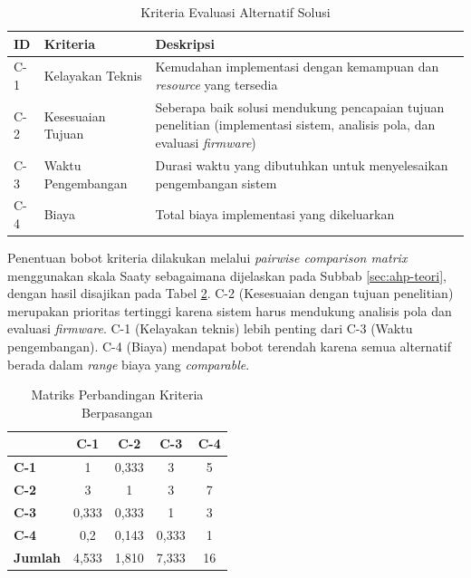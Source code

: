 \begin{table}[H]
  \caption{Kriteria Evaluasi Alternatif Solusi}
  \label{tab:kriteria-ahp}
  \begin{tabularx}{\textwidth}{| l | l | X |}
    \hline
    \textbf{ID} & \textbf{Kriteria} & \textbf{Deskripsi} \\
    \hline
    C-1 & Kelayakan Teknis & Kemudahan implementasi dengan kemampuan dan \textit{resource} yang tersedia \\
    \hline
    C-2 & Kesesuaian Tujuan & Seberapa baik solusi mendukung pencapaian tujuan penelitian (implementasi sistem, analisis pola, dan evaluasi \textit{firmware}) \\
    \hline
    C-3 & Waktu Pengembangan & Durasi waktu yang dibutuhkan untuk menyelesaikan pengembangan sistem \\
    \hline
    C-4 & Biaya & Total biaya implementasi yang dikeluarkan \\
    \hline
  \end{tabularx}
\end{table}

Penentuan bobot kriteria dilakukan melalui \textit{pairwise comparison matrix} menggunakan skala Saaty sebagaimana dijelaskan pada Subbab \ref{sec:ahp-teori}, dengan hasil disajikan pada Tabel \ref{tab:matriks-kriteria}. C-2 (Kesesuaian dengan tujuan penelitian) merupakan prioritas tertinggi karena sistem harus mendukung analisis pola dan evaluasi \textit{firmware}. C-1 (Kelayakan teknis) lebih penting dari C-3 (Waktu pengembangan). C-4 (Biaya) mendapat bobot terendah karena semua alternatif berada dalam \textit{range} biaya yang \textit{comparable}.

\begin{table}[H]
  \caption{Matriks Perbandingan Kriteria Berpasangan}
  \label{tab:matriks-kriteria}
  \begin{tabular}{| l | c | c | c | c |}
    \hline
    & \textbf{C-1} & \textbf{C-2} & \textbf{C-3} & \textbf{C-4} \\
    \hline
    \textbf{C-1} & 1     & 0,333 & 3     & 5 \\
    \hline
    \textbf{C-2} & 3     & 1     & 3     & 7 \\
    \hline
    \textbf{C-3} & 0,333 & 0,333 & 1     & 3 \\
    \hline
    \textbf{C-4} & 0,2   & 0,143 & 0,333 & 1 \\
    \hline
    \textbf{Jumlah} & 4,533 & 1,810 & 7,333 & 16 \\
    \hline
  \end{tabular}
\end{table}

